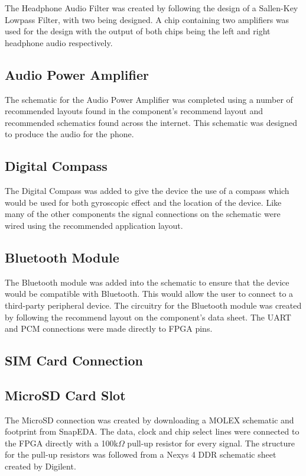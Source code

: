 	The Headphone Audio Filter was created by following the design of a Sallen-Key Lowpass Filter, with two being designed. A chip containing two amplifiers was used for the design with the output of both chips being the left and right headphone audio respectively. 

\subsection{Audio Power Amplifier}
\label{chap:audio}

	The schematic for the Audio Power Amplifier was completed using a number of recommended layouts found in the component's recommend layout and recommended schematics found across the internet. This schematic was designed to produce the audio for the phone. 

\subsection{Digital Compass}

	The Digital Compass was added to give the device the use of a compass which would be used for both gyroscopic effect and the location of the device.
Like many of the other components the signal connections on the schematic were wired using the recommended application layout. 

\subsection{Bluetooth Module}

	The Bluetooth module was added into the schematic to ensure that the device would be compatible with Bluetooth. This would allow the user to connect to a third-party peripheral device.
The circuitry for the Bluetooth module was created by following the recommend layout on the component's data sheet. The UART and PCM connections were made directly to FPGA pins. 

\subsection{SIM Card Connection}
\label{chap:SIM}

\subsection{MicroSD Card Slot}
\label{chap:SD}

	The MicroSD connection was created by downloading a MOLEX schematic and footprint from SnapEDA. The data, clock and chip select lines were connected to the FPGA directly with a 100k$\Omega$ pull-up resistor for every signal. The structure for the pull-up resistors was followed from a Nexys 4 DDR schematic sheet created by Digilent. 

